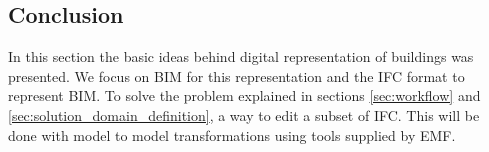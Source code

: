 \subsection{Conclusion}
In this section the basic ideas behind digital representation of buildings was presented. We focus on BIM for this representation and the IFC format to represent BIM. To solve the problem explained in sections \ref{sec:workflow} and \ref{sec:solution_domain_definition}, a way to edit a subset of IFC. This will be done with model to model transformations using tools supplied by EMF.